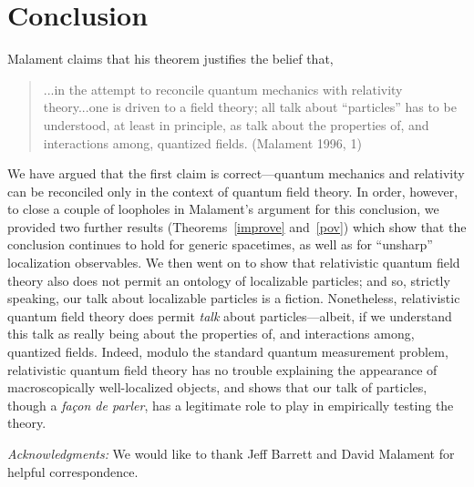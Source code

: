 \documentclass[12pt]{article}
\theoremstyle{remark}
\begin{document}
\section{Conclusion}
Malament claims that his theorem justifies the belief that,
\begin{quote}
  ...in the attempt to reconcile quantum mechanics with relativity
  theory...one is driven to a field theory; all talk about
  ``particles'' has to be understood, at least in principle, as talk
  about the properties of, and interactions among, quantized fields.
  (Malament 1996, 1) \end{quote} We have argued that the first claim
is correct---quantum mechanics and relativity can be reconciled only
in the context of quantum field theory.  In order, however, to close a
couple of loopholes in Malament's argument for this conclusion, we
provided two further results (Theorems~\ref{improve} and~\ref{pov})
which show that the conclusion continues to hold for generic
spacetimes, as well as for ``unsharp'' localization observables.  We
then went on to show that relativistic quantum field theory also does
not permit an ontology of localizable particles; and so, strictly
speaking, our talk about localizable particles is a fiction.
Nonetheless, relativistic quantum field theory does permit \emph{talk}
about particles---albeit, if we understand this talk as really being
about the properties of, and interactions among, quantized fields.
Indeed, modulo the standard quantum measurement problem, relativistic
quantum field theory has no trouble explaining the appearance of
macroscopically well-localized objects, and shows that our talk of
particles, though a \emph{fa{\c{c}}on de parler}, has a legitimate
role to play in empirically testing the theory.

\vspace{1em} {\it Acknowledgments:} We would like to thank Jeff
Barrett and David Malament for helpful correspondence.
\end{document}
